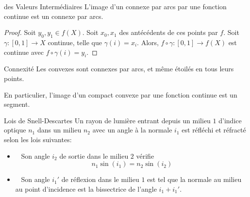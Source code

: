 \documentclass{cours}
\begin{document}
\begin{théorème}{des Valeurs Intermédiaires}{}
L'image d'un connexe par arcs par une fonction continue est un connexe par arcs.
\end{théorème}

\begin{proof}
    Soit $y_{0}, y_{1} \in f(X)$. Soit $x_{0}, x_{1}$ des antécédents de ces points par $f$. Soit $\gamma : [0, 1] \to X$ continue, telle que $\gamma(i) = x_{i}$. Alors, $f\circ \gamma : [0, 1] \to f(X)$ est continue avec $f\circ \gamma(i) = y_{i}$.
\end{proof}
\begin{propositionfr}{Connexité}{}
    Les convexes sont connexes par arcs, et même étoilés en tous leurs points.
\end{propositionfr}
En particulier, l'image d'un compact convexe par une fonction continue est un segment.
\begin{théorème}{Lois de Snell-Descartes}{}
Un rayon de lumière entrant depuis un milieu $1$ d'indice optique $n_{1}$ dans un milieu $n_{2}$ avec un angle à la normale $i_{1}$ est réfléchi et réfracté selon les lois suivantes:
\begin{itemize}
    \item \color{vulm}{Réfraction :}\ \color{black} Son angle $i_{2}$ de sortie dans le milieu $2$ vérifie \[n_{1}\sin{\left(i_{1}\right)} = n_{2}\sin{\left(i_{2}\right)}\]
    \item \color{vulm}{Réflexion :}\ \color{black} Son angle $i_{1}'$ de réflexion dans le milieu $1$ est tel que la normale au milieu au point d'incidence est la bissectrice de l'angle $i_{1} + i_{1}'$.
\end{itemize}
\end{théorème}
\end{document}
